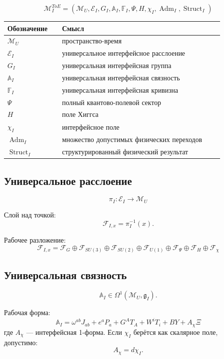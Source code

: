 \documentclass[12pt,a4paper]{article}
\newcommand{\Adm}{\operatorname{Adm}}
\newcommand{\Struct}{\operatorname{Struct}}
\begin{document}
\[
\boxed{
\mathcal M_I^{ToE}=
(\mathcal M_U,\mathcal E_I,G_I,\mathbb A_I,\mathbb F_I,\Psi,H,\chi_I,\Adm_I,\Struct_I)
}
\]

\begin{longtable}{>{\raggedright\arraybackslash}p{0.23\linewidth}>{\raggedright\arraybackslash}p{0.68\linewidth}}
\toprule
Обозначение & Смысл \\
\midrule
$\mathcal M_U$ & пространство-время \\
$\mathcal E_I$ & универсальное интерфейсное расслоение \\
$G_I$ & универсальная интерфейсная группа \\
$\mathbb A_I$ & универсальная интерфейсная связность \\
$\mathbb F_I$ & универсальная интерфейсная кривизна \\
$\Psi$ & полный квантово-полевой сектор \\
$H$ & поле Хиггса \\
$\chi_I$ & интерфейсное поле \\
$\Adm_I$ & множество допустимых физических переходов \\
$\Struct_I$ & структурированный физический результат \\
\bottomrule
\end{longtable}

\subsection{Универсальное расслоение}

\[
\boxed{\pi_I:\mathcal E_I\to\mathcal M_U}
\]

Слой над точкой:
\[
\boxed{\mathcal F_{I,x}=\pi_I^{-1}(x)}.
\]

Рабочее разложение:
\[
\boxed{
\mathcal F_{I,x}=\mathcal F_G\oplus\mathcal F_{SU(3)}\oplus\mathcal F_{SU(2)}\oplus\mathcal F_{U(1)}\oplus\mathcal F_\Psi\oplus\mathcal F_H\oplus\mathcal F_\chi
}
\]

\subsection{Универсальная связность}

\[
\boxed{\mathbb A_I\in\Omega^1(\mathcal M_U,\mathfrak g_I)}.
\]

Рабочая форма:
\[
\boxed{
\mathbb A_I=
\omega^{ab}J_{ab}+e^aP_a+G^AT_A+W^iT_i+BY+A_\chi\Xi
}
\]
где $A_\chi$ — интерфейсная 1-форма. Если $\chi_I$ берётся как скалярное поле, допустимо:
\[
\boxed{A_\chi=d\chi_I}.
\]
\end{document}
